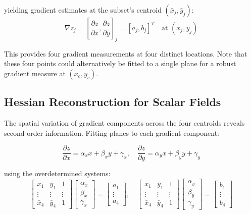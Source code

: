 \documentclass{article}
\begin{document}
yielding gradient estimates at the subset's centroid $(\bar{x}_j, \bar{y}_j)$:
\begin{equation}
\nabla z_j = \left[\frac{\partial z}{\partial x}, \frac{\partial z}{\partial y}\right]_j = [a_j, b_j]^T \quad \text{at } (\bar{x}_j, \bar{y}_j)
\end{equation}

This provides four gradient measurements at four distinct locations. Note that these four points could alternatively be fitted to a single plane for a robust gradient measure at $(x_c, y_c)$.

\subsection{Hessian Reconstruction for Scalar Fields}

The spatial variation of gradient components across the four centroids reveals second-order information. Fitting planes to each gradient component:

\begin{equation}
\frac{\partial z}{\partial x} = \alpha_x x + \beta_x y + \gamma_x, \quad \frac{\partial z}{\partial y} = \alpha_y x + \beta_y y + \gamma_y
\end{equation}

using the overdetermined systems:
\begin{equation}
\begin{bmatrix} \bar{x}_1 & \bar{y}_1 & 1 \\ \vdots & \vdots & \vdots \\ \bar{x}_4 & \bar{y}_4 & 1 \end{bmatrix} \begin{bmatrix} \alpha_x \\ \beta_x \\ \gamma_x \end{bmatrix} = \begin{bmatrix} a_1 \\ \vdots \\ a_4 \end{bmatrix}, \quad \begin{bmatrix} \bar{x}_1 & \bar{y}_1 & 1 \\ \vdots & \vdots & \vdots \\ \bar{x}_4 & \bar{y}_4 & 1 \end{bmatrix} \begin{bmatrix} \alpha_y \\ \beta_y \\ \gamma_y \end{bmatrix} = \begin{bmatrix} b_1 \\ \vdots \\ b_4 \end{bmatrix}
\end{equation}
\end{document}
